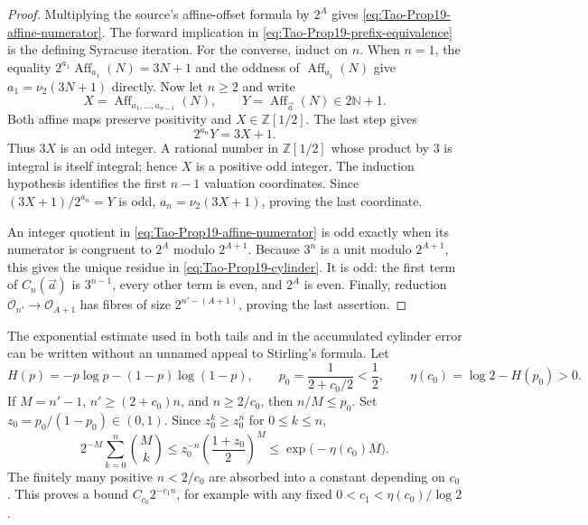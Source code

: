 \begin{proof}
Multiplying the source's affine-offset formula by \(2^A\) gives
\eqref{eq:Tao-Prop19-affine-numerator}.  The forward implication in
\eqref{eq:Tao-Prop19-prefix-equivalence} is the defining Syracuse iteration.
For the converse, induct on \(n\).  When \(n=1\), the equality
\(
  2^{a_1}\operatorname{Aff}_{a_1}(N)=3N+1
\)
and the oddness of \(\operatorname{Aff}_{a_1}(N)\) give
\(a_1=\nu_2(3N+1)\) directly.  Now let \(n\geq2\) and write
\[
 X=\operatorname{Aff}_{a_1,\ldots,a_{n-1}}(N),
 \qquad
 Y=\operatorname{Aff}_{\vec a}(N)\in2\mathbb N+1.
\]
Both affine maps preserve positivity and \(X\in\mathbb Z[1/2]\).  The last
step gives
\[
 2^{a_n}Y=3X+1.
\]
Thus \(3X\) is an odd integer.  A rational number in
\(\mathbb Z[1/2]\) whose product by \(3\) is integral is itself integral;
hence \(X\) is a positive odd integer.  The induction hypothesis identifies
the first \(n-1\) valuation coordinates.  Since
\((3X+1)/2^{a_n}=Y\) is odd, \(a_n=\nu_2(3X+1)\), proving the last coordinate.

An integer quotient in \eqref{eq:Tao-Prop19-affine-numerator} is odd exactly
when its numerator is congruent to \(2^A\) modulo \(2^{A+1}\).  Because
\(3^n\) is a unit modulo \(2^{A+1}\), this gives the unique residue in
\eqref{eq:Tao-Prop19-cylinder}.  It is odd: the first term of
\(C_n(\vec a)\) is \(3^{n-1}\), every other term is even, and \(2^A\) is
even.  Finally, reduction
\(\mathcal O_{n'}\to\mathcal O_{A+1}\) has fibres of size
\(2^{n'-(A+1)}\), proving the last assertion.
\end{proof}

The exponential estimate used in both tails and in the accumulated cylinder
error can be written without an unnamed appeal to Stirling's formula.  Let
\[
 H(p)=-p\log p-(1-p)\log(1-p),
 \qquad
 p_0=\frac1{2+c_0/2}<\frac12,
 \qquad
 \eta(c_0)=\log2-H(p_0)>0.
\]
If \(M=n'-1\), \(n'\geq(2+c_0)n\), and \(n\geq2/c_0\), then
\(n/M\leq p_0\).  Set \(z_0=p_0/(1-p_0)\in(0,1)\).  Since
\(z_0^k\geq z_0^n\) for \(0\leq k\leq n\),
\begin{equation}
\label{eq:Tao-Prop19-binomial-bound}
 2^{-M}\sum_{k=0}^n\binom Mk
 \leq z_0^{-n}\left(\frac{1+z_0}{2}\right)^M
 \leq \exp\bigl(-\eta(c_0)M\bigr).
\end{equation}
The finitely many positive \(n<2/c_0\) are absorbed into a constant depending
on \(c_0\).  This proves a bound \(C_{c_0}2^{-c_1n}\), for example with any
fixed \(0<c_1<\eta(c_0)/\log2\).

